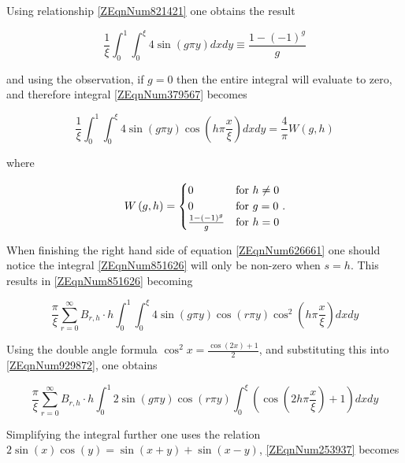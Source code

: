 Using relationship \eqref{ZEqnNum821421} one obtains the result

\begin{equation*}
    \frac{1}{\xi } \int _{0}^{1} \int _{0}^{\xi }4\sin \left(g\pi y\right)dxdy
    \equiv \frac{1-\left(-1\right)^{g} }{g} 
\end{equation*}

and using the observation, if $g = 0$ then the entire integral will evaluate to
zero, and therefore integral \eqref{ZEqnNum379567} becomes

\begin{equation} \label{ZEqnNum309765} 
    \frac{1}{\xi } \int _{0}^{1} \int _{0}^{\xi } 4 \sin \left(g\pi y\right) 
    \cos \left(h\pi \frac{x}{\xi } \right)dxdy
    =\frac{4}{\pi } W\left(g,h\right) 
\end{equation}

where

\begin{equation}\label{3.13} 
    W\left(g,h\right) = \begin{cases} 0 & \text{for } h \ne 0 \\ 0 & \text{for } g = 0 \\ \frac{1 - \left(-1 \right)^{g}}{g} & \text{for } h = 0 \end{cases}. 
\end{equation}

When finishing the right hand side of equation \eqref{ZEqnNum626661} one should
notice the integral \eqref{ZEqnNum851626} will only be non-zero when $s=h$. This
results in \eqref{ZEqnNum851626} becoming

\begin{equation} \label{ZEqnNum929872} 
    \frac{\pi }{\xi } \sum _{r=0}^{\infty} B_{r,h} \cdot 
    h\int _{0}^{1} \int _{0}^{\xi} 4\sin \left(g\pi y\right)
    \cos (r \pi y)\cos ^{2} \left(h\pi \frac{x}{\xi } \right) dxdy 
\end{equation}

Using the double angle formula $\cos ^{2} x=\frac{\cos \left(2x\right)+1}{2} $,
and substituting this into \eqref{ZEqnNum929872}, one obtains

\begin{equation} \label{ZEqnNum253937} 
    \frac{\pi }{\xi } \sum _{r=0}^{\infty} B_{r,h} \cdot 
    h \int _{0}^{1}2\sin \left(g\pi y\right)\cos (r\pi y) 
    \int_{0}^{\xi } \left(\cos \left(2h\pi \frac{x}{\xi } \right) + 1 \right) dxdy
\end{equation}

Simplifying the integral further one uses the relation $2\sin \left(x\right)\cos
\left(y\right)=\sin \left(x+y\right)+\sin \left(x-y\right)$,
\eqref{ZEqnNum253937} becomes

